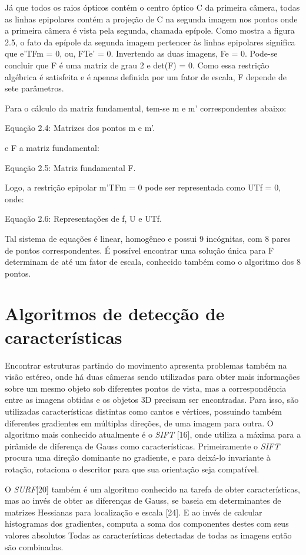 Já que todos os raios ópticos contém o centro óptico C da primeira câmera, todas as linhas epipolares contém a projeção de C na segunda imagem nos pontos onde a primeira câmera é vista pela segunda, chamada epípole. Como mostra a figura 2.5, o fato da epípole  da segunda imagem pertencer às linhas epipolares significa que e’TFm = 0, ou, FTe’ = 0. Invertendo as duas imagens, Fe = 0. Pode-se concluir que F é uma matriz de grau 2 e det(F) = 0. Como essa restrição algébrica é satisfeita e é apenas definida por um fator de escala, F depende de sete parâmetros.

Para o cálculo da matriz fundamental, tem-se m e m’ correspondentes abaixo:


Equação 2.4: Matrizes dos pontos m e m’.

e F a matriz fundamental:

Equação 2.5: Matriz fundamental F.

Logo, a restrição epipolar m’TFm = 0 pode ser representada como UTf = 0, onde:


Equação 2.6: Representações de f, U e UTf.

Tal sistema de equações é linear, homogêneo e possui 9 incógnitas, com 8 pares de pontos correspondentes. É possível encontrar uma solução única para F determinam de até um fator de escala, conhecido também como o algoritmo dos 8 pontos.


\section{Algoritmos de detecção de características}

Encontrar estruturas partindo do movimento apresenta problemas também na visão estéreo, onde há duas câmeras sendo utilizadas para obter mais informações sobre um mesmo objeto sob diferentes pontos de vista, mas a correspondência entre as imagens obtidas e os objetos 3D precisam ser encontradas. Para isso, são utilizadas características distintas como cantos e vértices, possuindo também diferentes gradientes em múltiplas direções, de uma imagem para outra. O algoritmo mais conhecido atualmente é o \textit{SIFT} [16], onde utiliza a máxima para a pirâmide de diferença de Gauss como características. Primeiramente o \textit{SIFT} procura uma direção dominante no gradiente, e para deixá-lo invariante à rotação, rotaciona o descritor para que sua orientação seja compatível.

O \textit{SURF}[20] também é um algoritmo conhecido na tarefa de obter características, mas ao invés de obter as diferenças de Gauss, se baseia em determinantes de matrizes Hessianas para localização e escala [24]. E ao invés de calcular histogramas dos gradientes, computa a soma dos componentes destes com seus valores absolutos Todas as características detectadas de todas as imagens então são combinadas.

